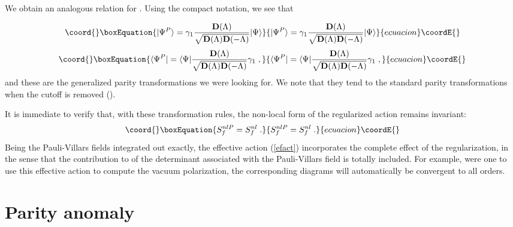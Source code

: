 \documentclass[a4paper,12pt]{article}
\begin{document}
We obtain an analogous relation for \coordHE{}. Using the compact
notation, we see that

\begin{equation}\coord{}\boxEquation{
 \label{eq:comp1}
|\Psi^P\rangle=\gamma_1 \frac{{\mathbf D}(\Lambda)}{\sqrt{{\mathbf D}(\Lambda){\mathbf D}(-\Lambda)}} |\Psi\rangle
}{
 |\Psi^P\rangle=\gamma_1 \frac{{\mathbf D}(\Lambda)}{\sqrt{{\mathbf D}(\Lambda){\mathbf D}(-\Lambda)}} |\Psi\rangle
}{ecuacion}\coordE{}\end{equation}
\begin{equation}\coord{}\boxEquation{
 \label{eq:comp2}
\langle \Psi^P|=\langle\Psi|\frac{{\mathbf D}(\Lambda)}{\sqrt{{\mathbf
      D}(\Lambda){\mathbf D}(-\Lambda)}} \gamma_1 \;,
}{
 \langle \Psi^P|=\langle\Psi|\frac{{\mathbf D}(\Lambda)}{\sqrt{{\mathbf
      D}(\Lambda){\mathbf D}(-\Lambda)}} \gamma_1 \;,
}{ecuacion}\coordE{}\end{equation}
and these are the generalized parity transformations we were looking
for. We note that they tend to the standard parity transformations
when the cutoff is removed (\myHighlight{$\Lambda \to \infty$}\coordHE{}).

It is immediate to verify that, with these transformation rules, the
non-local form of the regularized action remains invariant:
\begin{equation}\coord{}\boxEquation{
 \label{eq:snlinv}
S_f^{nl P}=S_f^{nl} \;.
}{
 S_f^{nl P}=S_f^{nl} \;.
}{ecuacion}\coordE{}\end{equation}
%
Being the Pauli-Villars fields integrated out exactly,
the effective action (\ref{efact})
 incorporates the complete effect of the regularization, in
the sense that 
 the contribution to \coordHE{} of the
determinant associated with the Pauli-Villars field is totally
 included. For 
example, were one to use this effective action to compute the
vacuum polarization, the corresponding diagrams will automatically
be convergent to all orders. 

\section{Parity anomaly}\label{sec:anom}
\end{document}
